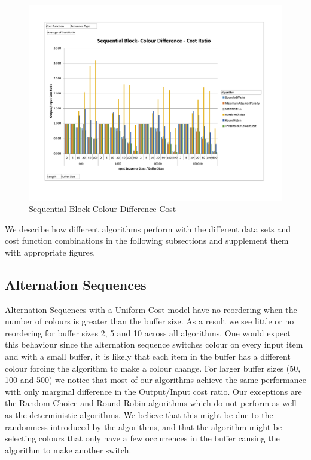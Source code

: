 \begin{figure}[ht]
\centering 
\includegraphics[scale=0.60]{Lengths-Sequential-Block-Colour-Difference.pdf}
\caption{Sequential-Block-Colour-Difference-Cost}
\label{lengthsSequentialBlockSeqColourDifference}
\end{figure}

We describe how different algorithms perform with the different data sets and cost function combinations in the following subsections and supplement them with appropriate figures.

\subsection{Alternation Sequences}

Alternation Sequences with a Uniform Cost model have no reordering when the number of colours is greater than the buffer size. As a result we see little or no reordering for buffer sizes 2, 5 and 10 across all algorithms. One would expect this behaviour since the alternation sequence switches colour on every input item and with a small buffer, it is likely that each item in the buffer has a different colour forcing the algorithm to make a colour change. For larger buffer sizes (50, 100 and 500) we notice that most of our algorithms achieve the same performance with only marginal difference in the Output/Input cost ratio. Our exceptions are the Random Choice and Round Robin algorithms which do not perform as well as the deterministic algorithms. We believe that this might be due to the randomness introduced by the algorithms, and that the algorithm might be selecting colours that only have a few occurrences in the buffer causing the algorithm to make another switch. 

